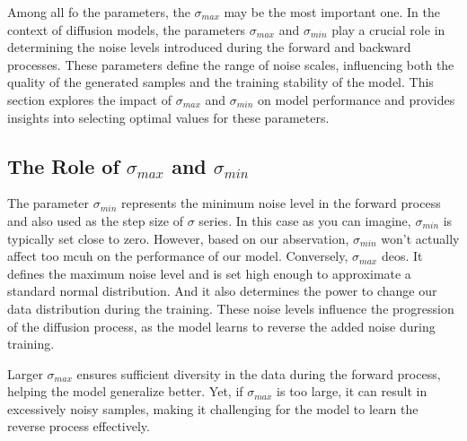 Among all fo the parameters, the $\sigma_{max}$ may be the most important one. In the context of diffusion models, the parameters $\sigma_{max}$ and $\sigma_{min}$ play a crucial role in determining the noise levels introduced during the forward and backward processes. These parameters define the range of noise scales, influencing both the quality of the generated samples and the training stability of the model. This section explores the impact of $\sigma_{max}$ and $\sigma_{min}$ on model performance and provides insights into selecting optimal values for these parameters.

\subsection{The Role of $\sigma_{max}$ and $\sigma_{min}$}

The parameter $\sigma_{min}$ represents the minimum noise level in the forward process and also used as the step size of $\sigma$ series. In this case as you can imagine, $\sigma_{min}$ is typically set close to zero. However, based on our abservation, $\sigma_{min}$ won't actually affect too mcuh on the performance of our model. Conversely, $\sigma_{max}$ deos. It defines the maximum noise level and is set high enough to approximate a standard normal distribution. And it also determines the power to change our data distribution during the training. These noise levels influence the progression of the diffusion process, as the model learns to reverse the added noise during training.

Larger $\sigma_{max}$ ensures sufficient diversity in the data during the forward process, helping the model generalize better. Yet, if $\sigma_{max}$ is too large, it can result in excessively noisy samples, making it challenging for the model to learn the reverse process effectively.

